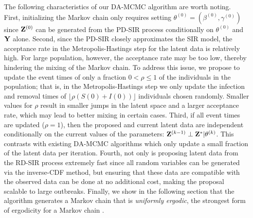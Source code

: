 \documentclass[11pt]{article}
\newcommand{\jx}[1]{{\color{blue}{ #1}}}
\begin{document}
	The following characteristics of our DA-MCMC algorithm are worth noting.
	First, initializing the Markov chain only requires setting $\theta^{(0)} = (\beta^{(0)}, \gamma^{(0)})$ since $\mathbf{Z}^{(0)}$ can be generated from the PD-SIR process conditionally on $\theta^{(0)}$ and $\mathbf{Y}$ alone.
	Second, since the PD-SIR closely approximates the SIR model, the acceptance rate in the Metropolis-Hastings step for the latent data is relatively high. For large population, however, the acceptance rate may be too low, thereby hindering the mixing of the Markov chain. To address this issue, we propose to update the event times of only a fraction $0<\rho\le 1$ of the individuals in the population; that is, in the Metropolis-Hastings step we only update the infection and removal times of $\lfloor\rho (S(0)+I(0))\rfloor$ individuals chosen randomly.
	Smaller values for $\rho$ result in smaller jumps in the latent space and a larger acceptance rate, which may lead to better mixing in certain cases.
	Third, if all event times are updated ($\rho = 1$), then the proposed and current latent data are independent conditionally on the current values of the parameters: $\mathbf{Z}^{(k-1)} \perp \mathbf{Z}^* | \theta^{(k)}$. This contrasts with existing DA-MCMC algorithms which only update a small fraction of the latent data per iteration.
	Fourth, not only is proposing latent data from the RD-SIR process extremely fast since all random variables can be generated via the inverse-CDF method, but ensuring that these data are compatible with the observed data can be done at no additional cost, making the proposal scalable to large outbreaks.
	Finally, we show in the following section that the algorithm generates a Markov chain that is \textit{uniformly ergodic}, the strongest form of ergodicity for a Markov chain \cite{Tierney.1994}. %
	
	\jx{We may insert a brief note explicitly contrasting with previous single-site RJMCMC work, giving a bit of intuition why we are able to avoid that change of space, and this could be a natural place to put it. Then, they also have a little more context for the experiment you've since added} 
	
\end{document}
